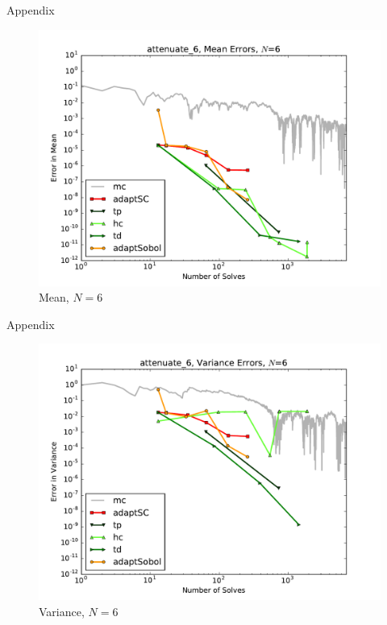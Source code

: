 \documentclass[t,9pt,svgnames]{beamer}
\begin{document}
\begin{frame}{Appendix}
  \begin{figure}
    \centering
    \includegraphics[width=0.8\linewidth]{../../inputs/paul/attenuate_6_mean_errs}
    \caption{Mean, $N=6$}
  \end{figure}
\end{frame}
\begin{frame}{Appendix}
  \begin{figure}
    \centering
    \includegraphics[width=0.8\linewidth]{../../inputs/paul/attenuate_6_variance_errs}
    \caption{Variance, $N=6$}
  \end{figure}
\end{frame}
\end{document}
